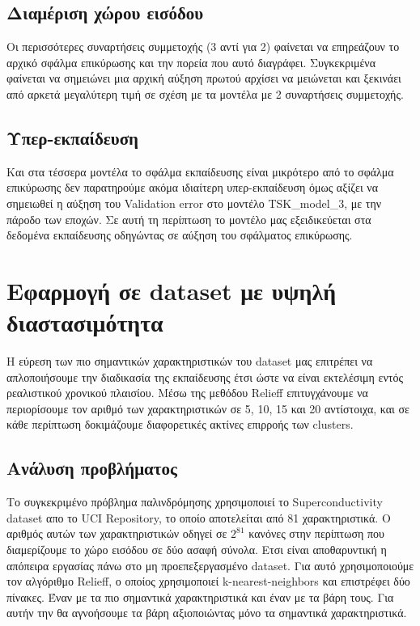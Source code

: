 \documentclass[12pt]{report}
\begin{document}
\subsection{Διαμέριση χώρου εισόδου}
Οι περισσότερες συναρτήσεις συμμετοχής (3 αντί για 2) φαίνεται να επηρεάζουν το αρχικό σφάλμα επικύρωσης και την πορεία που αυτό διαγράφει. Συγκεκριμένα φαίνεται να σημειώνει μια αρχική αύξηση πρωτού αρχίσει να μειώνεται και ξεκινάει από αρκετά μεγαλύτερη τιμή σε σχέση με τα μοντέλα με 2 συναρτήσεις συμμετοχής.

\subsection{Υπερ-εκπαίδευση}
Και στα τέσσερα μοντέλα το σφάλμα εκπαίδευσης είναι μικρότερο από το σφάλμα επικύρωσης δεν παρατηρούμε ακόμα ιδιαίτερη υπερ-εκπαίδευση όμως αξίζει να σημειωθεί η αύξηση του Validation error στο μοντέλο TSK\_model\_3, με την πάροδο των εποχών. Σε αυτή τη περίπτωση το μοντέλο μας εξειδικεύεται στα δεδομένα εκπαίδευσης οδηγώντας σε αύξηση του σφάλματος επικύρωσης.

\section{Εφαρμογή σε dataset με υψηλή διαστασιμότητα}
Η εύρεση των πιο σημαντικών χαρακτηριστικών του dataset μας επιτρέπει να απλοποιήσουμε την διαδικασία της εκπαίδευσης έτσι ώστε να είναι εκτελέσιμη εντός ρεαλιστικού χρονικού πλαισίου. Μέσω της μεθόδου Relieff επιτυγχάνουμε να περιορίσουμε τον αριθμό των χαρακτηριστικών σε 5, 10, 15 και 20 αντίστοιχα, και σε κάθε περίπτωση δοκιμάζουμε διαφορετικές ακτίνες επιρροής των clusters. 

\subsection{Ανάλυση προβλήματος}
Το συγκεκριμένο πρόβλημα παλινδρόμησης χρησιμοποιεί το Superconductivity dataset απο το UCI Repository, το οποίο αποτελείται από 81 χαρακτηριστικά. Ο αριθμός αυτών των χαρακτηριστικών οδηγεί σε $2^81$ κανόνες στην περίπτωση που διαμερίζουμε το χώρο εισόδου σε δύο ασαφή σύνολα. Ετσι είναι αποθαρυντική η απόπειρα εργασίας πάνω στο μη προεπεξεργασμένο dataset. Για αυτό χρησιμοποιούμε τον αλγόριθμο Relieff, ο οποίος χρησιμοποιεί k-nearest-neighbors και επιστρέφει δύο πίνακες. Έναν με τα πιο σημαντικά χαρακτηριστικά και έναν με τα βάρη τους. Για αυτήν την θα αγνοήσουμε τα βάρη αξιοποιώντας μόνο τα σημαντικά χαρακτηριστικά.
\end{document}
